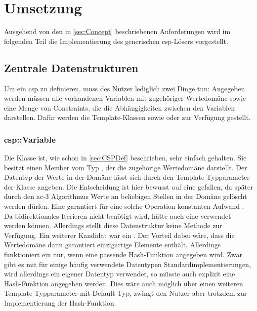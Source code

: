 \section{Umsetzung}
Ausgehend von den in \cref{sec:Concept} beschriebenen Anforderungen wird im folgenden Teil die Implementierung des generischen \ac*{csp}-Lösers vorgestellt.

\subsection{Zentrale Datenstrukturen}
Um ein \ac*{csp} zu definieren, muss des Nutzer lediglich zwei Dinge tun: Angegeben werden müssen alle vorhandenen Variablen mit zugehöriger Wertedomäne sowie eine Menge von
Constraints, die die Abhängigkeiten zwischen den Variablen darstellen. Dafür werden die Template-Klassen  sowie  oder
 zur Verfügung gestellt.

\subsubsection{csp::Variable}
Die Klasse  ist, wie schon in \cref{sec:CSPDef} beschrieben, sehr einfach gehalten. Sie besitzt einen Member vom Typ , der die zugehörige
Wertedomäne darstellt. Der Datentyp der Werte in der Domäne lässt sich durch den Template-Typparameter der Klasse angeben. Die Entscheidung ist hier bewusst auf eine
 gefallen, da später durch den \ac*{ac}-3 Algorithmus Werte an beliebigen Stellen in der Domäne gelöscht werden dürfen. Eine  garantiert für
eine solche Operation konstanten Aufwand \cite{stdList}. Da bidirektionales Iterieren nicht benötigt wird, hätte auch eine  verwendet werden können.
Allerdings stellt diese Datenstruktur keine Methode  zur Verfügung. Ein weiterer Kandidat war ein . Der Vorteil dabei wäre, dass die
Wertedomäne dann garantiert einzigartige Elemente enthält. Allerdings funktioniert ein  nur, wenn eine passende Hash-Funktion angegeben wird. Zwar gibt
es mit  für einige häufig verwendete Datentypen Standardimplementierungen, wird allerdings ein eigener Datentyp verwendet, so müsste auch explizit eine
Hash-Funktion angegeben werden. Dies wäre auch möglich über einen weiteren Template-Typparameter mit Default-Typ, zwingt den Nutzer aber trotzdem zur Implementierung der
Hash-Funktion.


